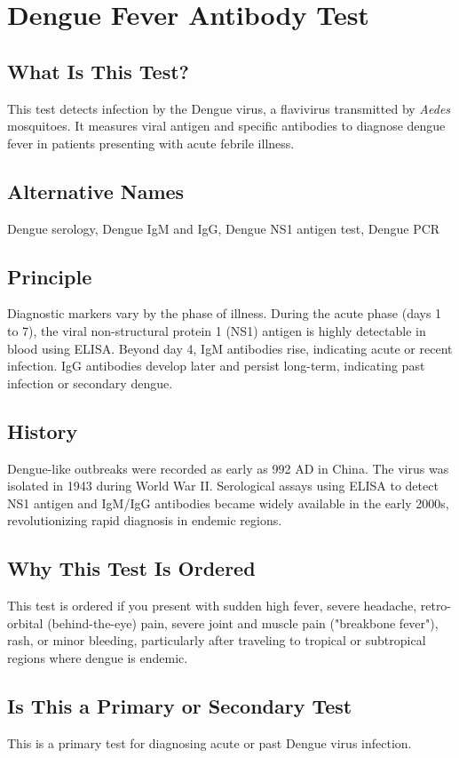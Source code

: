 \chapter{Dengue Fever Antibody Test}

\section*{What Is This Test?}
This test detects infection by the Dengue virus, a flavivirus transmitted by \textit{Aedes} mosquitoes. It measures viral antigen and specific antibodies to diagnose dengue fever in patients presenting with acute febrile illness.

\section*{Alternative Names}
Dengue serology, Dengue IgM and IgG, Dengue NS1 antigen test, Dengue PCR

\section*{Principle}
Diagnostic markers vary by the phase of illness. During the acute phase (days 1 to 7), the viral non-structural protein 1 (NS1) antigen is highly detectable in blood using ELISA. Beyond day 4, IgM antibodies rise, indicating acute or recent infection. IgG antibodies develop later and persist long-term, indicating past infection or secondary dengue.

\section*{History}
Dengue-like outbreaks were recorded as early as 992 AD in China. The virus was isolated in 1943 during World War II. Serological assays using ELISA to detect NS1 antigen and IgM/IgG antibodies became widely available in the early 2000s, revolutionizing rapid diagnosis in endemic regions.

\section*{Why This Test Is Ordered}
This test is ordered if you present with sudden high fever, severe headache, retro-orbital (behind-the-eye) pain, severe joint and muscle pain ("breakbone fever"), rash, or minor bleeding, particularly after traveling to tropical or subtropical regions where dengue is endemic.

\section*{Is This a Primary or Secondary Test}
This is a primary test for diagnosing acute or past Dengue virus infection.


